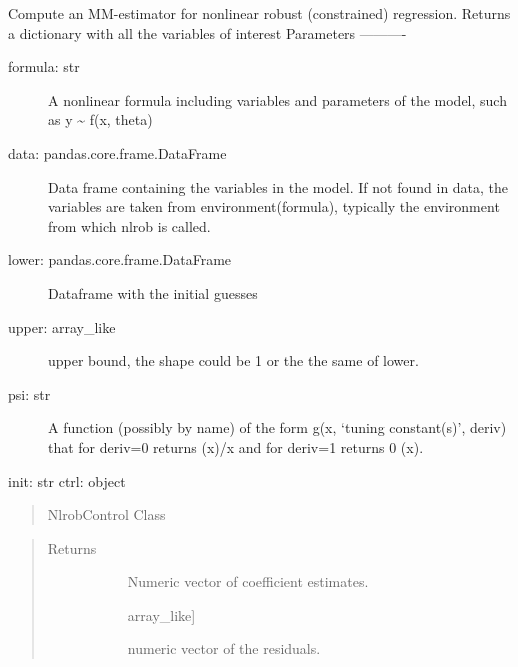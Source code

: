 \documentclass[letterpaper,10pt,english]{sphinxmanual}
\begin{document}
\begin{fulllineitems}
\label{\detokenize{_modules/nlrob:nlrob.nlrob_CM}}
Compute an MM-estimator for nonlinear robust (constrained) regression.
Returns a dictionary with all the variables of interest
Parameters
———-
\begin{description}
\item[{formula: str}] \leavevmode
A nonlinear formula including variables and parameters of the model,
such as y \textasciitilde{} f(x, theta)

\item[{data: pandas.core.frame.DataFrame}] \leavevmode
Data frame containing the variables in the model. If not found in
data, the variables are taken from environment(formula), typically
the environment from which nlrob is called.

\item[{lower: pandas.core.frame.DataFrame}] \leavevmode
Dataframe with the initial guesses

\item[{upper: array\_like}] \leavevmode
upper bound, the shape could be 1 or the the same of lower.

\item[{psi: str}] \leavevmode
A function (possibly by name) of the form g(x, ‘tuning constant(s)’,
deriv)
that for deriv=0 returns (x)/x and for deriv=1 returns  0 (x).

\end{description}

init: str
ctrl: object
\begin{quote}

NlrobControl Class
\end{quote}
\begin{quote}\begin{description}
\item[{Returns}] \leavevmode\begin{description}
\item[{}] \leavevmode
Numeric vector of coefficient estimates.

\item[{}] \leavevmode{[}array\_like{]}
\item[{}] \leavevmode
numeric vector of the residuals.


\end{description}
\end{description}
\end{quote}
\end{fulllineitems}
\end{document}
